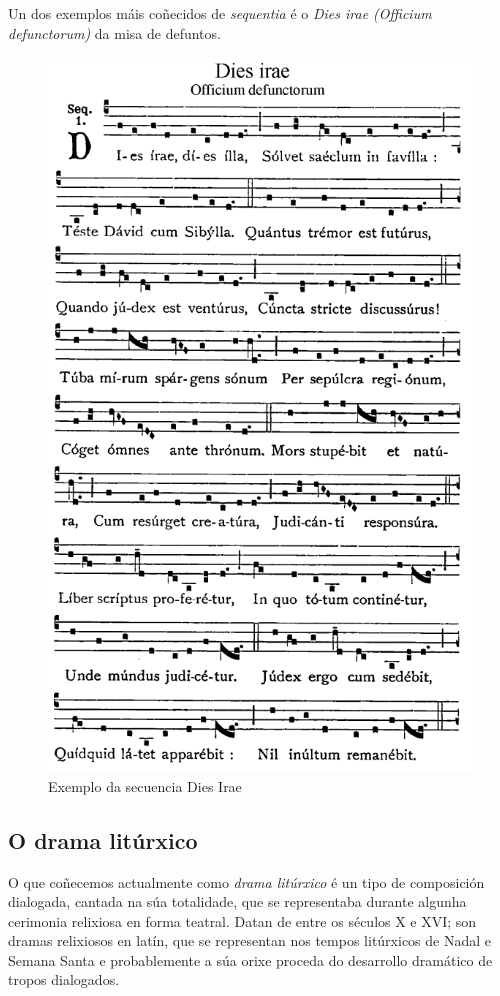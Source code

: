 \documentclass[spanish, a4paper,nobind]{templates/ociamthesis}
\begin{document}
Un dos exemplos máis coñecidos de \emph{sequentia} é o \emph{Dies irae (Officium defunctorum)} da misa de defuntos.

\begin{figure}[ht]

{\centering \includegraphics[width=0.75\linewidth]{figures/ud-03/Dies-irae} 

}

\caption[Secuencia Dies irae]{Exemplo da secuencia Dies Irae}\label{fig:Dies-irae}
\end{figure}

\hypertarget{o-drama-lituxfarxico}{%
\subsection*{O drama litúrxico}\label{o-drama-lituxfarxico}}

O que coñecemos actualmente como \emph{drama litúrxico} é un tipo de composición dialogada, cantada na súa totalidade, que se representaba durante algunha cerimonia relixiosa en forma teatral. Datan de entre os séculos X e XVI; son dramas relixiosos en latín, que se representan nos tempos litúrxicos de Nadal e Semana Santa e probablemente a súa orixe proceda do desarrollo dramático de tropos dialogados.
\end{document}
